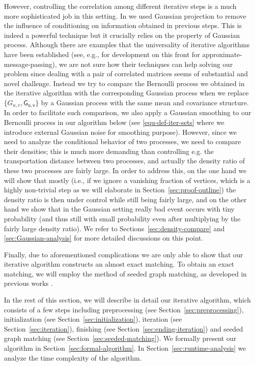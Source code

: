 \documentclass[11pt]{article}
\numberwithin{equation}{section}
\begin{document}
However, controlling the correlation among different iterative steps is a much more sophisticated job in this setting. In \cite{DL22+} we used Gaussian projection to remove the influence of conditioning on information obtained in previous steps. This is indeed a powerful technique but it crucially relies on the property of Gaussian process. Although there are examples that the universality of iterative algorithms have been established (see, e.g., \cite{BLM15, CL21, FWZ22+} for development on this front for approximate-message-passing), we are not sure how their techniques can help solving our problem since dealing with a pair of correlated matrices seems of substantial and novel challenge. Instead we try to compare the Bernoulli process we obtained in the iterative algorithm with the corresponding Gaussian process when we replace  $\{G_{u,v}, \mathsf{G}_{\mathsf{u,v}}\}$ by a Gaussian process with the same mean and covariance structure. In order to facilitate such comparison, we also apply a Gaussian smoothing to our Bernoulli process in our algorithm below (see \eqref{equ-def-iter-sets} where we introduce external Gaussian noise for smoothing purpose). However, since we need to analyze the conditional behavior of two processes, we need to compare their densities; this is much more demanding than controlling e.g. the transportation distance between two processes, and actually the density ratio of these two processes are fairly large. In order to address this, on the one hand we will show that mostly (i.e., if we ignore a vanishing fraction of vertices, which is a highly non-trivial step as we will elaborate in Section~\ref{sec:proof-outline}) the density ratio is then under control while still being fairly large, and on the other hand we show that in the Gaussian setting really bad event occurs with tiny probability (and thus still with small probability even after multiplying by the fairly large density ratio). We refer to Sections~\ref{sec:density-compare} and \ref{sec:Gaussian-analysis} for more detailed discussions on this point. 

Finally, due to aforementioned complications we are only able to show that our iterative algorithm constructs an almost exact matching. To obtain an exact matching, we will employ the method of seeded graph matching, as developed in previous works \cite{BCL19, MX20, MWXY22+}.

In the rest of this section, we will describe in detail our iterative algorithm, which consists of a few steps including preprocessing (see Section~\ref{sec:preprocessing}), initialization (see Section~\ref{sec:initialization}), iteration (see Section~\ref{sec:iteration}), finishing (see Section~\ref{sec:ending-iteration}) and seeded graph matching (see Section~\ref{sec:seeded-matching}). We formally present our algorithm in Section~\ref{sec:formal-algorithm}. In Section~\ref{sec:runtime-analysis} we analyze the time complexity of the algorithm.
\end{document}
